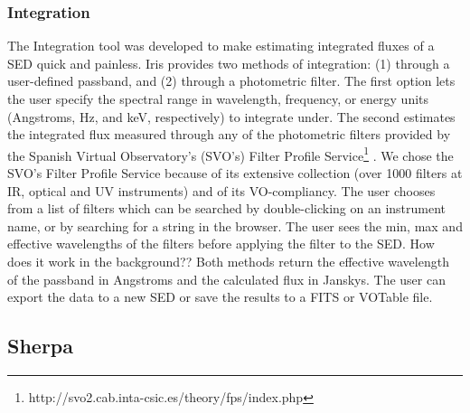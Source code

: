 \subsubsection{Integration}
The Integration tool was developed to make estimating integrated fluxes of a SED quick and painless. Iris provides two methods of integration: (1) through a user-defined passband, and (2) through a photometric filter. The first option lets the user specify the spectral range in wavelength, frequency, or energy units (Angstroms, Hz, and keV, respectively) to integrate under. The second estimates the integrated flux measured through any of the photometric filters provided by the Spanish Virtual Observatory's (SVO's) Filter Profile Service\footnote{http://svo2.cab.inta-csic.es/theory/fps/index.php} \cite{2013arXiv1312.3249S}. We chose the SVO's Filter Profile Service because of its extensive collection (over 1000 filters at IR, optical and UV instruments) and of its VO-compliancy. The user chooses from a list of filters which can be searched by double-clicking on an instrument name, or by searching for a string in the browser. The user sees the min, max and effective wavelengths of the filters before applying the filter to the SED.
How does it work in the background??
Both methods return the effective wavelength of the passband in Angstroms and the calculated flux in Janskys. The user can export the data to a new SED or save the results to a FITS or VOTable file.

\subsection{Sherpa}
\label{subsec:sherpa}



